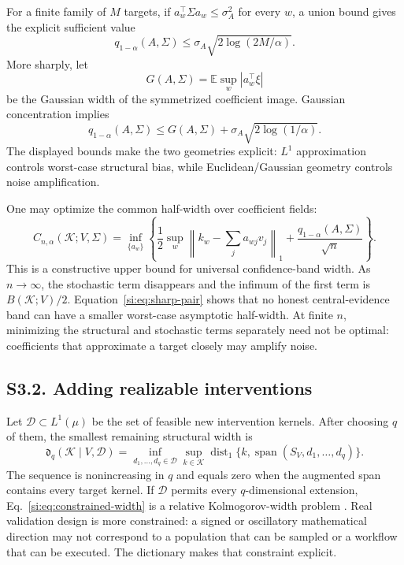 \documentclass[10pt,twocolumn]{article}
\newcommand{\E}{\mathbb{E}}
\newcommand{\cK}{\mathcal K}
\newcommand{\cD}{\mathcal D}
\newcommand{\dist}{\operatorname{dist}}
\newcommand{\Span}{\operatorname{span}}
\begin{document}
For a finite family of $M$ targets, if $a_w^\top\Sigma a_w\le\sigma_A^2$ for every $w$, a union bound gives the explicit sufficient value
\begin{equation}
q_{1-\alpha}(A,\Sigma)
\le\sigma_A\sqrt{2\log(2M/\alpha)}.
\label{si:eq:unionq}
\end{equation}
More sharply, let
\begin{equation}
G(A,\Sigma)=\E\sup_w|a_w^\top\xi|
\label{si:eq:gaussianwidth}
\end{equation}
be the Gaussian width of the symmetrized coefficient image. Gaussian concentration implies
\begin{equation}
q_{1-\alpha}(A,\Sigma)
\le G(A,\Sigma)+\sigma_A\sqrt{2\log(1/\alpha)}.
\label{si:eq:borell}
\end{equation}
The displayed bounds make the two geometries explicit: $L^1$ approximation controls worst-case structural bias, while Euclidean/Gaussian geometry controls noise amplification.

One may optimize the common half-width over coefficient fields:
\begin{equation}
C_{n,\alpha}(\cK;V,\Sigma)
=\inf_{\{a_w\}}
\left\{
\frac12\sup_w\left\|k_w-\sum_ja_{wj}v_j\right\|_1
+\frac{q_{1-\alpha}(A,\Sigma)}{\sqrt n}
\right\}.
\label{si:eq:capacity}
\end{equation}
This is a constructive upper bound for universal confidence-band width. As $n\to\infty$, the stochastic term disappears and the infimum of the first term is $B(\cK;V)/2$. Equation~\ref{si:eq:sharp-pair} shows that no honest central-evidence band can have a smaller worst-case asymptotic half-width. At finite $n$, minimizing the structural and stochastic terms separately need not be optimal: coefficients that approximate a target closely may amplify noise.

\subsection*{S3.2. Adding realizable interventions}

Let $\cD\subset L^1(\mu)$ be the set of feasible new intervention kernels. After choosing $q$ of them, the smallest remaining structural width is
\begin{equation}
\mathfrak d_q(\cK\mid V,\cD)
=\inf_{d_1,\ldots,d_q\in\cD}
\sup_{k\in\cK}\dist_1\{k,\Span(S_V,d_1,\ldots,d_q)\}.
\label{si:eq:constrained-width}
\end{equation}
The sequence is nonincreasing in $q$ and equals zero when the augmented span contains every target kernel. If $\cD$ permits every $q$-dimensional extension, Eq.~\ref{si:eq:constrained-width} is a relative Kolmogorov-width problem \citep{pinkus1985}. Real validation design is more constrained: a signed or oscillatory mathematical direction may not correspond to a population that can be sampled or a workflow that can be executed. The dictionary makes that constraint explicit.
\end{document}
